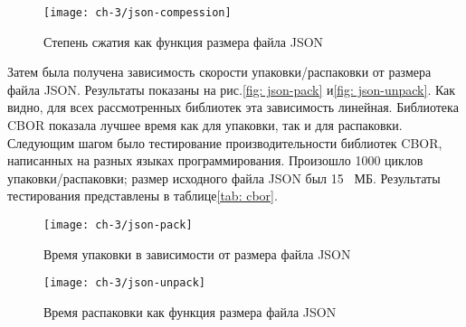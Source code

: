 \begin{figure}[!htb]
	\centering
	\texttt{[image: ch-3/json-compession]}
	\caption{Степень сжатия как функция размера файла JSON}
	\label{fig:json-compress}
\end{figure}


Затем была получена зависимость скорости упаковки/распаковки от размера файла JSON. Результаты показаны на рис.\cref{fig: json-pack} и\cref{fig: json-unpack}. Как видно, для всех рассмотренных библиотек эта зависимость линейная. Библиотека CBOR показала лучшее время как для упаковки, так и для распаковки.
Следующим шагом было тестирование производительности библиотек CBOR, написанных на разных языках программирования. Произошло 1000 циклов упаковки/распаковки; размер исходного файла JSON был 15 \, МБ. Результаты тестирования представлены в таблице\cref{tab: cbor}.

\begin{figure}[!ht]
	\centering
	\texttt{[image: ch-3/json-pack]}
	\caption{Время упаковки в зависимости от размера файла JSON}
	\label{fig:json-pack}
\end{figure}

\begin{figure}[!ht]
	\centering
	\texttt{[image: ch-3/json-unpack]}
	\caption{Время распаковки как функция размера файла JSON}
	\label{fig:json-unpack}
\end{figure}

%
%
%
